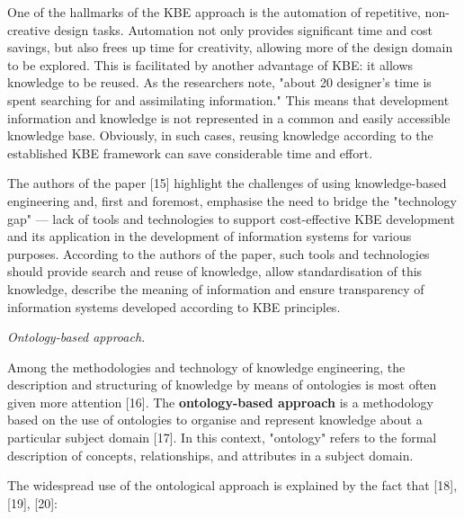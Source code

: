 \documentclass[a4paper]{article}
\begin{document}
\begin{multicols}{2}
{\fontsize{9.5}{13}\selectfont One of the hallmarks of the KBE approach is the automation of repetitive, non-creative design tasks. Automation not only provides significant time and cost savings,
but also frees up time for creativity, allowing more of
the design domain to be explored. This is facilitated
by another advantage of KBE: it allows knowledge to
be reused. As the researchers note, "about 20%
designer’s time is spent searching for and assimilating
information." This means that development information
and knowledge is not represented in a common and
easily accessible knowledge base. Obviously, in such
cases, reusing knowledge according to the established
KBE framework can save considerable time and effort.}


{\fontsize{9.5}{13}\selectfont The authors of the paper [15] highlight the challenges of using knowledge-based engineering and, first and foremost, emphasise the need to bridge the "technology gap" — lack of tools and technologies to support cost-effective KBE development and its application in the development of information systems for various purposes. According to the authors of the paper, such tools and technologies should provide search and reuse of knowledge, allow standardisation of this knowledge, describe the meaning of information and ensure transparency of information systems developed according to KBE principles.  
}

{\setlength{\parindent}{0pt}\nohyphens{\textit{Ontology-based approach.}}} \par

{\fontsize{9.5}{13}\selectfont Among the methodologies and technology of knowledge engineering, the description and structuring of knowledge by means of ontologies is most often given more attention [16]. The \textbf{ontology-based approach} is a methodology based on the use of ontologies to organise and represent knowledge about a particular subject domain [17]. In this context, "ontology" refers to the formal description of concepts, relationships, and attributes in a subject domain. 
}

{\fontsize{9.5}{13}\selectfont The widespread use of the ontological approach is explained by the fact that [18], [19], [20]: 
}

\begin{itemize}[leftmargin=5mm]
        

\end{itemize}
\end{multicols}
\end{document}
